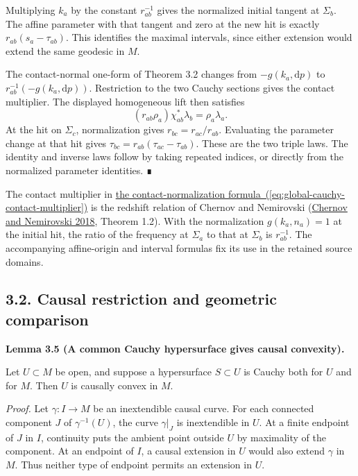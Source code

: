 \documentclass[
  english,
  11pt,
  reqno]{amsart}
\makeatletter
\newcommand{\paperdisplaynext}{%
  \let\paper@savedstartsection\@startsection
  \def\@startsection##1##2##3##4##5##6{%
    \let\@startsection\paper@savedstartsection
    \@tempskipa ##5\relax
    \ifdim\@tempskipa<\z@
      \def\paper@afterskip{.35\baselineskip}%
    \else
      \def\paper@afterskip{##5}%
    \fi
    \@startsection{##1}{##2}{##3}{##4}{\paper@afterskip}{##6}}}
\newcommand{\paperdisplaysection}{\paperdisplaynext\subsection}
\newcommand{\pandocstatementheading}[1]{%
  \par\if@nobreak\else
    \addpenalty{\@beginparpenalty}%
    \addvspace{.5\baselineskip plus .2\baselineskip minus .2\baselineskip}%
  \fi
  {\normalfont\bfseries #1\par}%
  \nobreak\@afterindenttrue\@afterheading
}
\makeatother
\begin{document}
Multiplying \(k_a\) by the constant \(r_{ab}^{-1}\) gives the normalized
initial tangent at \(\Sigma_b\). The affine parameter with that tangent
and zero at the new hit is exactly \(r_{ab}(s_a-\tau_{ab})\). This
identifies the maximal intervals, since either extension would extend
the same geodesic in \(M\).

The contact-normal one-form of Theorem 3.2 changes from
\(-g(k_a,\mathrm dp)\) to \(r_{ab}^{-1}(-g(k_a,\mathrm dp))\).
Restriction to the two Cauchy sections gives the contact multiplier. The
displayed homogeneous lift then satisfies \[
(r_{ab}\rho_a)\chi_{ab}^*\lambda_b
=\rho_a\lambda_a.
\] At the hit on \(\Sigma_c\), normalization gives
\(r_{bc}=r_{ac}/r_{ab}\). Evaluating the parameter change at that hit
gives \(\tau_{bc}=r_{ab}(\tau_{ac}-\tau_{ab})\). These are the two
triple laws. The identity and inverse laws follow by taking repeated
indices, or directly from the normalized parameter identities. ∎

The contact multiplier in
\hyperref[eq:global-cauchy-contact-multiplier]{the contact-normalization
formula~(\ref*{eq:global-cauchy-contact-multiplier})} is the redshift relation of Chernov and Nemirovski
(\hyperref[ref-ChernovNemirovski2018]{Chernov and Nemirovski 2018},
Theorem 1.2). With the normalization \(g(k_a,n_a)=1\) at the initial
hit, the ratio of the frequency at \(\Sigma_a\) to that at \(\Sigma_b\)
is \(r_{ab}^{-1}\). The accompanying affine-origin and interval formulas
fix its use in the retained source domains.

\protect{}\label{sec:causal-restriction-and-geometric-comparison}
\paperdisplaysection{3.2. Causal restriction and geometric
comparison}\label{causal-restriction-and-geometric-comparison}
\pandocstatementheading{\protect{}\label{lem:common-cauchy-causal-convexity}Lemma 3.5 (A common Cauchy hypersurface gives causal convexity).}

Let \(U\subset M\) be open, and suppose a hypersurface \(S\subset U\) is
Cauchy both for \(U\) and for \(M\). Then \(U\) is causally convex in
\(M\).

\emph{Proof.} Let \(\gamma:I\to M\) be an inextendible causal curve. For
each connected component \(J\) of \(\gamma^{-1}(U)\), the curve
\(\gamma|_J\) is inextendible in \(U\). At a finite endpoint of \(J\) in
\(I\), continuity puts the ambient point outside \(U\) by maximality of
the component. At an endpoint of \(I\), a causal extension in \(U\)
would also extend \(\gamma\) in \(M\). Thus neither type of endpoint
permits an extension in \(U\).
\end{document}
